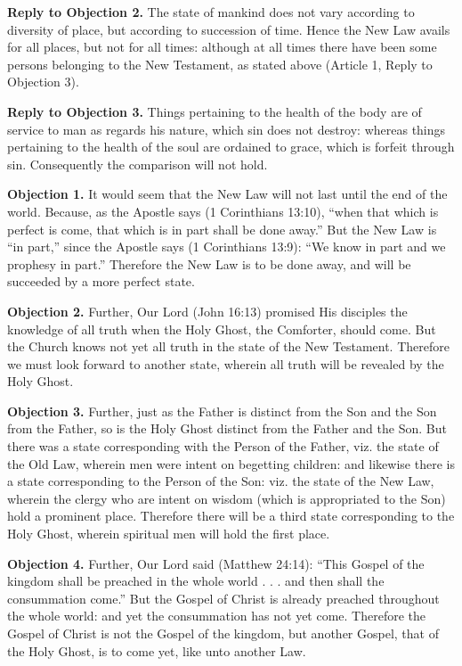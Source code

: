 \textbf{Reply to Objection 2.} The state of mankind does not vary according to diversity of place, but according to succession of time. Hence the New Law avails for all places, but not for all times: although at all times there have been some persons belonging to the New Testament, as stated above (Article 1, Reply to Objection 3).

\textbf{Reply to Objection 3.} Things pertaining to the health of the body are of service to man as regards his nature, which sin does not destroy: whereas things pertaining to the health of the soul are ordained to grace, which is forfeit through sin. Consequently the comparison will not hold.


\textbf{Objection 1.} It would seem that the New Law will not last until the end of the world. Because, as the Apostle says (1 Corinthians 13:10), ``when that which is perfect is come, that which is in part shall be done away.'' But the New Law is ``in part,'' since the Apostle says (1 Corinthians 13:9): ``We know in part and we prophesy in part.'' Therefore the New Law is to be done away, and will be succeeded by a more perfect state.

\textbf{Objection 2.} Further, Our Lord (John 16:13) promised His disciples the knowledge of all truth when the Holy Ghost, the Comforter, should come. But the Church knows not yet all truth in the state of the New Testament. Therefore we must look forward to another state, wherein all truth will be revealed by the Holy Ghost.

\textbf{Objection 3.} Further, just as the Father is distinct from the Son and the Son from the Father, so is the Holy Ghost distinct from the Father and the Son. But there was a state corresponding with the Person of the Father, viz. the state of the Old Law, wherein men were intent on begetting children: and likewise there is a state corresponding to the Person of the Son: viz. the state of the New Law, wherein the clergy who are intent on wisdom (which is appropriated to the Son) hold a prominent place. Therefore there will be a third state corresponding to the Holy Ghost, wherein spiritual men will hold the first place.

\textbf{Objection 4.} Further, Our Lord said (Matthew 24:14): ``This Gospel of the kingdom shall be preached in the whole world . . . and then shall the consummation come.'' But the Gospel of Christ is already preached throughout the whole world: and yet the consummation has not yet come. Therefore the Gospel of Christ is not the Gospel of the kingdom, but another Gospel, that of the Holy Ghost, is to come yet, like unto another Law.

